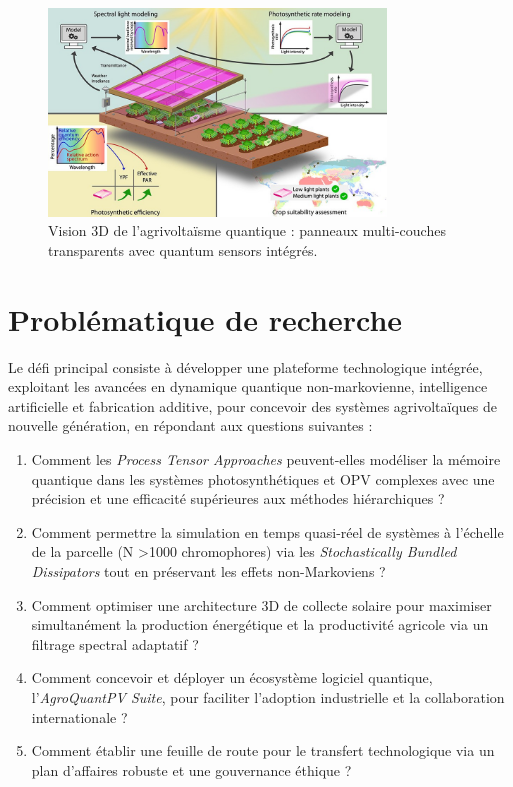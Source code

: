 \documentclass[12pt, a4paper]{article}
\begin{document}
\begin{figure}[htb]
    \centering
    \includegraphics[width=0.8\textwidth]{agri-photovoltaic.jpg}
    \caption{Vision 3D de l'agrivoltaïsme quantique : panneaux multi-couches transparents avec quantum sensors intégrés.}
    \label{fig_agrivoltaic_3d}
\end{figure}

\section{Problématique de recherche}

Le défi principal consiste à développer une plateforme technologique intégrée, exploitant les avancées en dynamique quantique non-markovienne, intelligence artificielle et fabrication additive, pour concevoir des systèmes agrivoltaïques de nouvelle génération, en répondant aux questions suivantes :
\begin{enumerate}
  \item Comment les \textit{Process Tensor Approaches} peuvent-elles modéliser la mémoire quantique dans les systèmes photosynthétiques et OPV complexes avec une précision et une efficacité supérieures aux méthodes hiérarchiques ?

  \item Comment permettre la simulation en temps quasi-réel de systèmes à l'échelle de la parcelle (N \num{>1000} chromophores) via les \textit{Stochastically Bundled Dissipators} tout en préservant les effets non-Markoviens ?

  \item Comment optimiser une architecture 3D de collecte solaire pour maximiser simultanément la production énergétique et la productivité agricole via un filtrage spectral adaptatif ?

  \item Comment concevoir et déployer un écosystème logiciel quantique, l'\textit{AgroQuantPV Suite}, pour faciliter l'adoption industrielle et la collaboration internationale ?

  \item Comment établir une feuille de route pour le transfert technologique via un plan d'affaires robuste et une gouvernance éthique ?
\end{enumerate}
\end{document}

